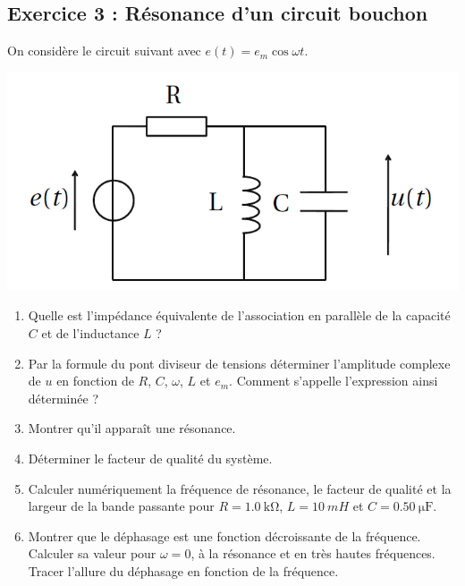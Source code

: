 \subsection{Exercice 3 : Résonance d'un circuit bouchon}

On considère le circuit suivant avec $e(t) = e_m \cos \omega t$.

\includegraphics[width = \textwidth]{./Images/mpsi_s19_ex03.png}

\begin{enumerate}
	\item Quelle est l'impédance équivalente de l'association en parallèle de la capacité $C$ et de l'inductance $L$ ?
	\item Par la formule du pont diviseur de tensions déterminer l'amplitude complexe de $u$ en fonction de $R$, $C$, $\omega$, $L$ et $e_m$. Comment s'appelle l'expression ainsi déterminée ?
	\item Montrer qu'il apparaît une résonance. 
	\item Déterminer le facteur de qualité du système.
	\item Calculer numériquement la fréquence de résonance, le facteur de qualité et la largeur de la bande passante pour $R = \SI{1.0}{\kilo\ohm}$, $L = \SI{10}{mH}$ et $C = \SI{0.50}{\micro\farad}$.
	\item Montrer que le déphasage est une fonction décroissante de la fréquence. Calculer sa valeur pour $\omega = 0$, à la résonance et en très hautes fréquences. Tracer l'allure du déphasage en fonction de la fréquence.
\end{enumerate}
